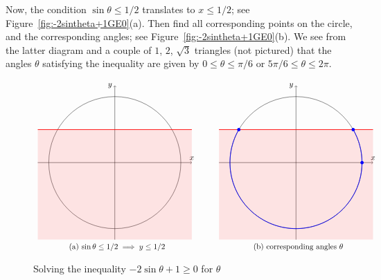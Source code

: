 \documentclass{article}
\begin{document}
\begin{enumerate}
\begin{enumerate}
    Now, the condition $\sin\theta\le 1/2$ translates to $x\le 1/2$;
    see Figure~\ref{fig:-2sintheta+1GE0}(a).
    Then find all corresponding points on the circle, and the
    corresponding angles; see Figure~\ref{fig:-2sintheta+1GE0}(b).
    We see from the latter diagram and a couple of $1$, $2$,
    $\sqrt{3}$ triangles (not pictured) that the angles $\theta$ satisfying
    the inequality are given by $0\le\theta\le \pi/6$ or $5\pi/6\le
    \theta\le 2\pi$.
    \begin{figure}[htbp]
      \centering
      $\begin{array}{c@{\hspace{1cm}}c}
        \begin{tikzpicture}
          \draw[->] (-3.5,0)--(3.5,0) node[above]{$x$};
          \draw[->] (0,-3.5)--(0,3.5) node[left]{$y$};
          \draw (0,0) circle (3);
          \fill[red,very nearly transparent] (-3.5,-3.5)--(3.5,-3.5)--(3.5,3/2)--(-3.5,3/2)--cycle;
          \draw[red,thick] (-3.5,3/2)--(3.5,3/2);
        \end{tikzpicture}
        &
        \begin{tikzpicture}
          \draw[->] (-3.5,0)--(3.5,0) node[above]{$x$};
          \draw[->] (0,-3.5)--(0,3.5) node[left]{$y$};
          \draw (0,0) circle (3);
          \fill[red,very nearly transparent] (-3.5,-3.5)--(3.5,-3.5)--(3.5,3/2)--(-3.5,3/2)--cycle;
          \draw[red,thick] (-3.5,3/2)--(3.5,3/2);
          \draw[thick,blue] (150:3) node[fill=blue,inner
            sep=1.5pt,shape=circle]{} arc (150:360:3) arc (0:30:3)
          node[fill=blue,inner sep=1.5pt,shape=circle]{};
          \draw[blue] node[fill=blue,inner sep=1.5pt,shape=circle] (A)
          at (3,0) {};
        \end{tikzpicture}
        \\
        \mbox{(a) $\sin\theta\le 1/2\implies y\le 1/2$}
        &
        \mbox{(b) corresponding angles $\theta$}
        \end{array}$
      \caption{Solving the inequality $-2\sin\theta+1\ge 0$ for $\theta$}

\end{figure}
\end{enumerate}
\end{enumerate}
\end{document}
